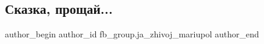  
 
 
 
 

\subsection{Сказка, прощай...}
\label{sec:24_02_2023.fb.fb_group.ja_zhivoj_mariupol.2.skazka__proshchai_}

\ifcmt
 author_begin
   author_id fb_group.ja_zhivoj_mariupol
 author_end
\fi
